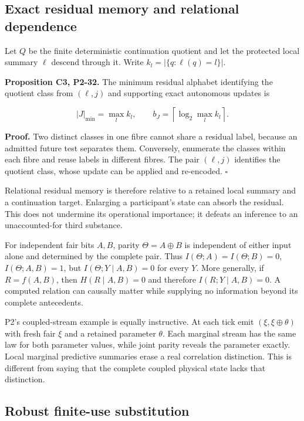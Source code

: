 \documentclass[
  11pt,
  a4paper,
]{article}
\begin{document}
\subsection{Exact residual memory and relational
dependence}\label{exact-residual-memory-and-relational-dependence}

Let \(Q\) be the finite deterministic continuation quotient and let the
protected local summary \(\ell\) descend through it. Write
\(k_l=|\{q:\ell(q)=l\}|\).

\textbf{Proposition C3, P2-32.} The minimum residual alphabet
identifying the quotient class from \((\ell,j)\) and supporting exact
autonomous updates is

\[|J|_{\min}=\max_l k_l,\qquad b_J=\left\lceil\log_2\max_l k_l\right\rceil.\]

\textbf{Proof.} Two distinct classes in one fibre cannot share a
residual label, because an admitted future test separates them.
Conversely, enumerate the classes within each fibre and reuse labels in
different fibres. The pair \((\ell,j)\) identifies the quotient class,
whose update can be applied and re-encoded. \(\square\)

Relational residual memory is therefore relative to a retained local
summary and a continuation target. Enlarging a participant's state can
absorb the residual. This does not undermine its operational importance;
it defeats an inference to an unaccounted-for third substance.

For independent fair bits \(A,B\), parity \(\Theta=A\oplus B\) is
independent of either input alone and determined by the complete pair.
Thus \(I(\Theta;A)=I(\Theta;B)=0\), \(I(\Theta;A,B)=1\), but
\(I(\Theta;Y\mid A,B)=0\) for every \(Y\). More generally, if
\(R=f(A,B)\), then \(H(R\mid A,B)=0\) and therefore
\(I(R;Y\mid A,B)=0\). A computed relation can causally matter while
supplying no information beyond its complete antecedents.

P2's coupled-stream example is equally instructive. At each tick emit
\((\xi,\xi\oplus\theta)\) with fresh fair \(\xi\) and a retained
parameter \(\theta\). Each marginal stream has the same law for both
parameter values, while joint parity reveals the parameter exactly.
Local marginal predictive summaries erase a real correlation
distinction. This is different from saying that the complete coupled
physical state lacks that distinction.

\subsection{Robust finite-use
substitution}\label{robust-finite-use-substitution}
\end{document}

